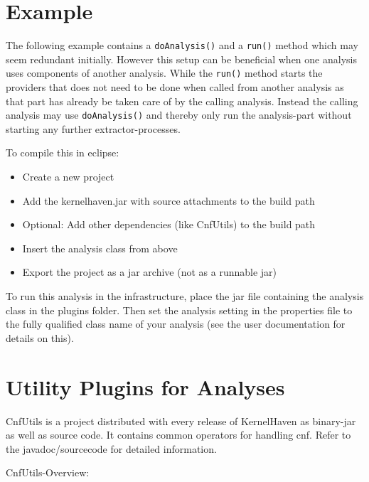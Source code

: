\section{Example}

The following example contains a \texttt{doAnalysis()} and a \texttt{run()} method which may seem redundant initially. However this setup can be beneficial when one analysis uses components of another analysis. While the \texttt{run()} method starts the providers that does not need to be done when called from another analysis as that part has already be taken care of by the calling analysis. Instead the calling analysis may use \texttt{doAnalysis()} and thereby only run the analysis-part without starting any further extractor-processes.



To compile this in eclipse:
\begin{itemize}
    \item Create a new project
    \item Add the kernelhaven.jar with source attachments to the build path
    \item Optional: Add other dependencies (like CnfUtils) to the build path
    \item Insert the analysis class from above
    \item Export the project as a jar archive (not as a runnable jar)
\end{itemize}

To run this analysis in the infrastructure, place the jar file containing the analysis class in the plugins folder. Then set the analysis setting in the properties file to the fully qualified class name of your analysis (see the user documentation for details on this).




\section{Utility Plugins for Analyses}


CnfUtils is a project distributed with every release of KernelHaven as binary-jar as well as source code. It contains common operators for handling cnf. Refer to the javadoc/sourcecode for detailed information.

CnfUtils-Overview:

